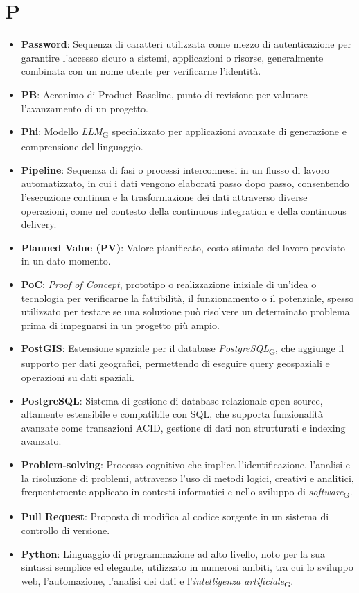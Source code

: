 \section*{P}  
\begin{itemize}
    \item \textbf{Password}: Sequenza di caratteri utilizzata come mezzo di autenticazione per garantire l'accesso sicuro a sistemi, applicazioni o risorse, generalmente combinata con un nome utente per verificarne l'identità.
    \item \textbf{PB}: Acronimo di Product Baseline, punto di revisione per valutare l'avanzamento di un progetto.
    \item \textbf{Phi}: Modello \textit{LLM}\textsubscript{G} specializzato per applicazioni avanzate di generazione e comprensione del linguaggio.
    \item \textbf{Pipeline}: Sequenza di fasi o processi interconnessi in un flusso di lavoro automatizzato, in cui i dati vengono elaborati passo dopo passo, consentendo l'esecuzione continua e la trasformazione dei dati attraverso diverse operazioni, come nel contesto della continuous integration e della continuous delivery.
    \item \textbf{Planned Value (PV)}: Valore pianificato, costo stimato del lavoro previsto in un dato momento.
    \item \textbf{PoC}: \textit{Proof of Concept}, prototipo o realizzazione iniziale di un'idea o tecnologia per verificarne la fattibilità, il funzionamento o il potenziale, spesso utilizzato per testare se una soluzione può risolvere un determinato problema prima di impegnarsi in un progetto più ampio.
    \item \textbf{PostGIS}: Estensione spaziale per il database \textit{PostgreSQL}\textsubscript{G}, che aggiunge il supporto per dati geografici, permettendo di eseguire query geospaziali e operazioni su dati spaziali.
    \item \textbf{PostgreSQL}: Sistema di gestione di database relazionale open source, altamente estensibile e compatibile con SQL, che supporta funzionalità avanzate come transazioni ACID, gestione di dati non strutturati e indexing avanzato.
    \item \textbf{Problem-solving}: Processo cognitivo che implica l'identificazione, l'analisi e la risoluzione di problemi, attraverso l'uso di metodi logici, creativi e analitici, frequentemente applicato in contesti informatici e nello sviluppo di \textit{software}\textsubscript{G}.
    \item \textbf{Pull Request}: Proposta di modifica al codice sorgente in un sistema di controllo di versione.
    \item \textbf{Python}: Linguaggio di programmazione ad alto livello, noto per la sua sintassi semplice ed elegante, utilizzato in numerosi ambiti, tra cui lo sviluppo web, l'automazione, l'analisi dei dati e l'\textit{intelligenza artificiale}\textsubscript{G}.
\end{itemize}

